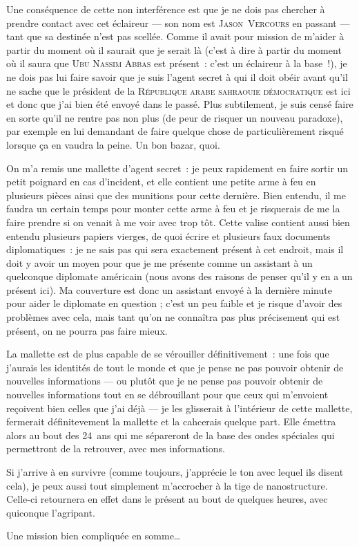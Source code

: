 {	Une conséquence de cette non interférence est que je ne dois pas chercher à prendre contact avec cet éclaireur — son nom est \textsc{Jason~Vercours} en passant — tant que sa destinée n’est pas scellée.  Comme il avait pour mission de m’aider à partir du moment où il saurait que je serait là (c’est à dire à partir du moment où il saura que \textsc{Ubu Nassim Abbas} est présent~:  c’est un éclaireur à la base~!), je ne dois pas lui faire savoir que je suis l’agent secret à qui il doit obéir avant qu’il ne sache que le président de la \textsc{République arabe sahraouie démocratique} est ici et donc que j’ai bien été envoyé dans le passé.
	Plus subtilement, je suis censé faire en sorte qu’il ne rentre pas non plus (de peur de risquer un nouveau paradoxe), par exemple en lui demandant de faire quelque chose de particulièrement risqué lorsque ça en vaudra la peine.
	Un bon bazar, quoi.

	On m’a remis une mallette d’agent secret~:  je peux rapidement en faire sortir un petit poignard en cas d’incident, et elle contient une petite arme à feu en plusieurs pièces ainsi que des munitions pour cette dernière.  Bien entendu, il me faudra un certain temps pour monter cette arme à feu et je risquerais de me la faire prendre si on venait à me voir avec trop tôt.
	Cette valise contient aussi bien entendu plusieurs papiers vierges, de quoi écrire et plusieurs faux documents diplomatiques~:  je ne sais pas qui sera exactement présent à cet endroit, mais il doit y avoir un moyen pour que je me présente comme un assistant à un quelconque diplomate américain (nous avons des raisons de penser qu’il y en a un présent ici).  Ma couverture est donc un assistant envoyé à la dernière minute pour aider le diplomate en question ; c’est un peu faible et je risque d’avoir des problèmes avec cela, mais tant qu’on ne connaîtra pas plus précisement qui est présent, on ne pourra pas faire mieux.

	La mallette est de plus capable de se vérouiller définitivement~:  une fois que j’aurais les identités de tout le monde et que je pense ne pas pouvoir obtenir de nouvelles informations — ou plutôt que je ne pense pas pouvoir obtenir de nouvelles informations tout en se débrouillant pour que ceux qui m’envoient reçoivent bien celles que j’ai déjà — je les glisserait à l’intérieur de cette mallette, fermerait définitevement la mallette et la cahcerais quelque part.
	Elle émettra alors au bout des 24~ans qui me sépareront de la base des ondes spéciales qui permettront de la retrouver, avec mes informations.

	Si j’arrive à en survivre (comme toujours, j’apprécie le ton avec lequel ils disent cela), je peux aussi tout simplement m’accrocher à la tige de nanostructure.
	Celle-ci retournera en effet dans le présent au bout de quelques heures, avec quiconque l’agripant.

	Une mission bien compliquée en somme…
}

